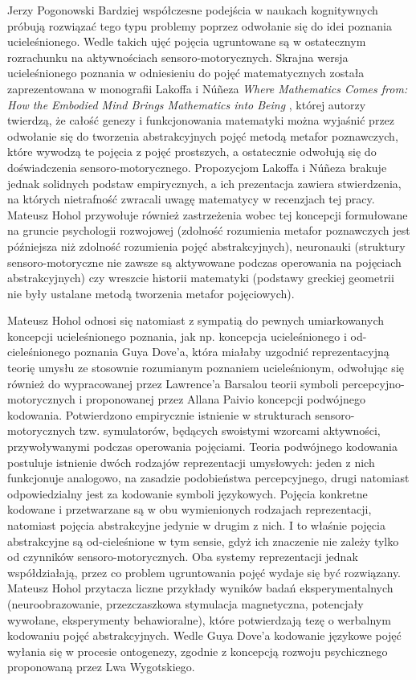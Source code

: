 \begin{newrevengenv}{Jerzy Pogonowski}
Bardziej
współczesne podejścia w naukach kognitywnych próbują rozwiązać
tego typu problemy poprzez odwołanie się do idei poznania
ucieleśnionego. Wedle takich ujęć pojęcia ugruntowane są w
ostatecznym rozrachunku na aktywnościach sensoro-motorycznych.
Skrajna wersja ucieleśnionego poznania w odniesieniu do pojęć
matematycznych została zaprezentowana w monografii Lakoffa i
N\'{u}\~{n}eza {\em Where Mathematics Comes from: How the Embodied Mind Brings Mathematics into Being} \parencite{lakoff_where_2000},
której autorzy twierdzą, że całość genezy i funkcjonowania
matematyki można wyjaśnić przez odwołanie się do tworzenia
abstrakcyjnych pojęć metodą metafor poznawczych, które wywodzą te
pojęcia z pojęć prostszych, a ostatecznie odwołują się do
doświadczenia sensoro-motorycznego. Propozycjom Lakoffa i
N\'{u}\~{n}eza brakuje jednak solidnych podstaw empirycznych, a
ich prezentacja zawiera stwierdzenia, na których nietrafność
zwracali uwagę matematycy w recenzjach tej pracy. Mateusz Hohol
przywołuje również zastrzeżenia wobec tej koncepcji formułowane na
gruncie psychologii rozwojowej (zdolność rozumienia metafor
poznawczych jest późniejsza niż zdolność rozumienia pojęć
abstrakcyjnych), neuronauki (struktury sensoro-motoryczne nie
zawsze są aktywowane podczas operowania na pojęciach
abstrakcyjnych) czy wreszcie historii matematyki (podstawy
greckiej geometrii nie były ustalane metodą tworzenia metafor
pojęciowych). 

Mateusz Hohol odnosi się natomiast z sympatią do
pewnych umiarkowanych koncepcji ucieleśnionego poznania, jak np.
koncepcja ucieleśnionego i od-cieleśnionego poznania Guya Dove'a,
która miałaby uzgodnić reprezentacyjną teorię umysłu ze stosownie
rozumianym poznaniem ucieleśnionym, odwołując się również do
wypracowanej przez Lawrence'a Barsalou teorii symboli
percepcyjno-motorycznych i proponowanej przez Allana Paivio
koncepcji podwójnego kodowania. Potwierdzono empirycznie istnienie
w strukturach sensoro-motorycznych tzw. symulatorów, będących
swoistymi wzorcami aktywności, przywoływanymi podczas operowania
pojęciami. Teoria podwójnego kodowania postuluje istnienie dwóch
rodzajów reprezentacji umysłowych: jeden z nich funkcjonuje
analogowo, na zasadzie podobieństwa percepcyjnego, drugi natomiast
odpowiedzialny jest za kodowanie symboli językowych. Pojęcia
konkretne kodowane i przetwarzane są w obu wymienionych rodzajach
reprezentacji, natomiast pojęcia abstrakcyjne jedynie w drugim z
nich. I to właśnie pojęcia abstrakcyjne są od-cieleśnione w tym
sensie, gdyż ich znaczenie nie zależy tylko od czynników
sensoro-motorycznych. Oba systemy reprezentacji jednak
współdziałają, przez co problem ugruntowania pojęć wydaje się być
rozwiązany. Mateusz Hohol przytacza liczne przykłady wyników badań
eksperymentalnych (neuroobrazowanie, przezczaszkowa stymulacja
magnetyczna, potencjały wywołane, eksperymenty behawioralne),
które potwierdzają tezę o werbalnym kodowaniu pojęć
abstrakcyjnych. Wedle Guya Dove'a kodowanie językowe pojęć wyłania
się w procesie ontogenezy, zgodnie z koncepcją rozwoju
psychicznego proponowaną przez Lwa Wygotskiego.


\end{newrevengenv}
